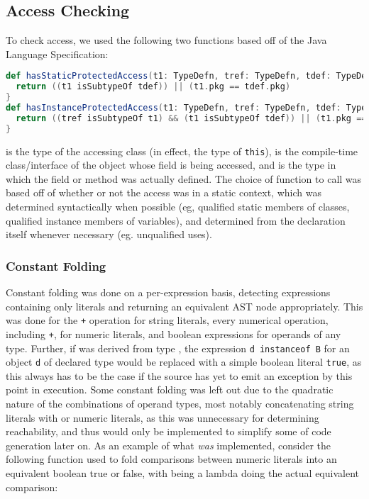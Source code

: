 \documentclass{article}
\begin{document}
\subsection{Access Checking}
To check access, we used the following two functions based off of the Java Language Specification:
\begin{lstlisting}[language=Scala]
def hasStaticProtectedAccess(t1: TypeDefn, tref: TypeDefn, tdef: TypeDefn): Boolean = {
  return ((t1 isSubtypeOf tdef)) || (t1.pkg == tdef.pkg)
}
def hasInstanceProtectedAccess(t1: TypeDefn, tref: TypeDefn, tdef: TypeDefn): Boolean = {
  return ((tref isSubtypeOf t1) && (t1 isSubtypeOf tdef)) || (t1.pkg == tdef.pkg)
}
\end{lstlisting}
\value{t1} is the type of the accessing class (in effect, the type of \texttt{this}), \value{tref} is the compile-time
class/interface of the object whose field is being accessed, and \value{tdef} is the type in which the field or method was
actually defined. The choice of function to call was based off of whether or not the access was in a static context, which
was determined syntactically when possible (eg, qualified static members of classes, qualified instance members of variables),
and determined from the declaration itself whenever necessary (eg. unqualified uses).

\subsubsection{Constant Folding}
Constant folding was done on a per-expression basis, detecting expressions containing only literals and returning an equivalent
AST node appropriately. This was done for the \texttt{+} operation for string literals, every numerical operation, including
\texttt{+}, for numeric literals, and boolean expressions for operands of any type. Further, if  was derived from type ,
the expression \texttt{d instanceof B} for an object \texttt{d} of declared type  would be replaced with a simple boolean literal
\texttt{true}, as this always has to be the case if the source has yet to emit an exception by this point in execution. Some constant folding
was left out due to the quadratic nature of the combinations of operand types, most notably concatenating string literals with \value{null}
or numeric literals, as this was unnecessary for determining reachability, and thus would only be implemented to simplify some of code
generation later on. As an example of what \emph{was} implemented, consider the following function used to fold comparisons between 
numeric literals into an equivalent boolean true or false, with  being a lambda doing the actual equivalent comparison:
\end{document}
